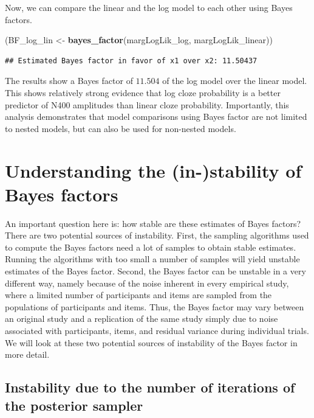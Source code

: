 \documentclass[12pt,]{krantz}
\newenvironment{Shaded}{\begin{snugshade}}{\end{snugshade}}
\newcommand{\KeywordTok}[1]{\textcolor[rgb]{0.13,0.29,0.53}{\textbf{#1}}}
\newcommand{\StringTok}[1]{\textcolor[rgb]{0.31,0.60,0.02}{#1}}
\newcommand{\NormalTok}[1]{#1}
\theoremstyle{definition}
\theoremstyle{definition}
\theoremstyle{definition}
\theoremstyle{remark}
\begin{document}
Now, we can compare the linear and the log model to each other using
Bayes factors.

\begin{Shaded}
\begin{Highlighting}[]
\NormalTok{(BF_log_lin <-}\StringTok{ }\KeywordTok{bayes_factor}\NormalTok{(margLogLik_log, margLogLik_linear))}
\end{Highlighting}
\end{Shaded}

\begin{verbatim}
## Estimated Bayes factor in favor of x1 over x2: 11.50437
\end{verbatim}

The results show a Bayes factor of \(11.504\) of the log model over the
linear model. This shows relatively strong evidence that log cloze
probability is a better predictor of N400 amplitudes than linear cloze
probability. Importantly, this analysis demonstrates that model
comparisons using Bayes factor are not limited to nested models, but can
also be used for non-nested models.

\section{Understanding the (in-)stability of Bayes
factors}\label{understanding-the-in-stability-of-bayes-factors}

An important question here is: how stable are these estimates of Bayes
factors? There are two potential sources of instability. First, the
sampling algorithms used to compute the Bayes factors need a lot of
samples to obtain stable estimates. Running the algorithms with too
small a number of samples will yield unstable estimates of the Bayes
factor. Second, the Bayes factor can be unstable in a very different
way, namely because of the noise inherent in every empirical study,
where a limited number of participants and items are sampled from the
populations of participants and items. Thus, the Bayes factor may vary
between an original study and a replication of the same study simply due
to noise associated with participants, items, and residual variance
during individual trials. We will look at these two potential sources of
instability of the Bayes factor in more detail.

\subsection{Instability due to the number of iterations of the posterior
sampler}\label{instability-due-to-the-number-of-iterations-of-the-posterior-sampler}
\end{document}
